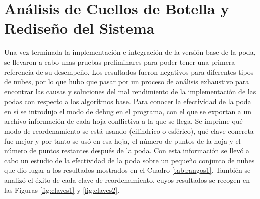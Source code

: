 \section{Análisis de Cuellos de Botella y Rediseño del Sistema}
Una vez terminada la implementación e integración de la versión base de la poda, se llevaron a cabo unas pruebas preliminares para poder tener una primera referencia de su desempeño. Los resultados fueron negativos para diferentes tipos de nubes, por lo que hubo que pasar por un proceso de análisis exhaustivo para encontrar las causas y soluciones del mal rendimiento de la implementación de las podas con respecto a los algoritmos base. Para conocer la efectividad de la poda en sí se introdujo el modo de debug en el programa, con el que se exportan a un archivo información de cada hoja conflictiva a la que se llega. Se imprime qué modo de reordenamiento se está usando (cilíndrico o esférico), qué clave concreta fue mejor y por tanto se usó en esa hoja, el número de puntos de la hoja y el número de puntos restantes después de la poda. Con esta información se llevó a cabo un estudio de la efectividad de la poda sobre un pequeño conjunto de nubes que dio lugar a los resultados mostrados en el Cuadro \ref{tab:rangos1}. También se analizó el éxito de cada clave de reordenamiento, cuyos resultados se recogen en las Figuras \ref{fig:claves1} y \ref{fig:claves2}.


